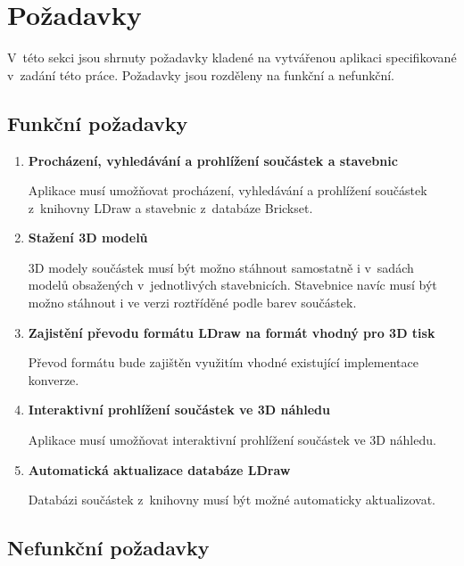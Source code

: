 \section{Požadavky}
V~této sekci jsou shrnuty požadavky kladené na vytvářenou aplikaci specifikované v~zadání této práce. Požadavky jsou rozděleny na funkční a nefunkční.

\subsection{Funkční požadavky}

\begin{enumerate}[label=FP-\arabic*]
    \item \label{fp:model:search} \textbf{Procházení, vyhledávání a prohlížení součástek a stavebnic}

    Aplikace musí umožňovat procházení, vyhledávání a prohlížení součástek z~knihovny LDraw a stavebnic z~databáze Brickset. 

    \item \label{fp:model:download} \textbf{Stažení 3D modelů}

    3D modely součástek musí být možno stáhnout samostatně i v~sadách modelů obsažených v~jednotlivých stavebnicích. Stavebnice navíc musí být možno stáhnout i ve verzi roztříděné podle barev součástek.

    \item \label{fp:model:prevod} \textbf{Zajistění převodu formátu LDraw na formát vhodný pro 3D tisk}

    Převod formátu bude zajištěn využitím vhodné existující implementace konverze. 

    \item \label{fp:model:3Dview} \textbf{Interaktivní prohlížení součástek ve 3D náhledu}

    Aplikace musí umožňovat interaktivní prohlížení součástek ve 3D náhledu.

    \item \label{fp:model:update} \textbf{Automatická aktualizace databáze LDraw}

    Databázi součástek z~knihovny musí být možné automaticky aktualizovat.

\end{enumerate}

\subsection{Nefunkční požadavky}

